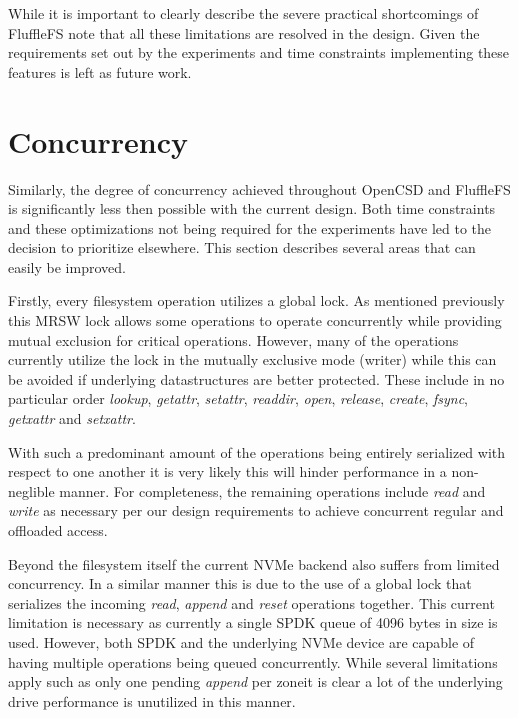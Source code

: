 While it is important to clearly describe the severe practical shortcomings of
FluffleFS note that all these limitations are resolved in the design. Given the
requirements set out by the experiments and time constraints implementing these
features is left as future work.

\section{Concurrency}

Similarly, the degree of concurrency achieved throughout OpenCSD and FluffleFS
is significantly less then possible with the current design. Both time
constraints and these optimizations not being required for the experiments have
led to the decision to prioritize elsewhere. This section describes several
areas that can easily be improved.

Firstly, every filesystem operation utilizes a global lock. As mentioned
previously this MRSW lock allows some operations to operate concurrently while
providing mutual exclusion for critical operations. However, many of the
operations currently utilize the lock in the mutually exclusive mode (writer)
while this can be avoided if underlying datastructures are better protected.
These include in no particular order \textit{lookup}, \textit{getattr},
\textit{setattr}, \textit{readdir}, \textit{open}, \textit{release},
\textit{create}, \textit{fsync}, \textit{getxattr} and \textit{setxattr}.

With such a predominant amount of the operations being entirely serialized with
respect to one another it is very likely this will hinder performance in a
non-neglible manner. For completeness, the remaining operations include
\textit{read} and \textit{write} as necessary per our design requirements to
achieve concurrent regular and offloaded access.

Beyond the filesystem itself the current NVMe backend also suffers from limited
concurrency. In a similar manner this is due to the use of a global lock that
serializes the incoming \textit{read}, \textit{append} and \textit{reset}
operations together. This current limitation is necessary as currently a single
SPDK queue of 4096 bytes in size is used. However, both SPDK and the underlying
NVMe device are capable of having multiple operations being queued concurrently.
While several limitations apply such as only one pending \textit{append} per
zone\footnotemark[16] it is clear a lot of the underlying drive performance is
unutilized in this manner.

